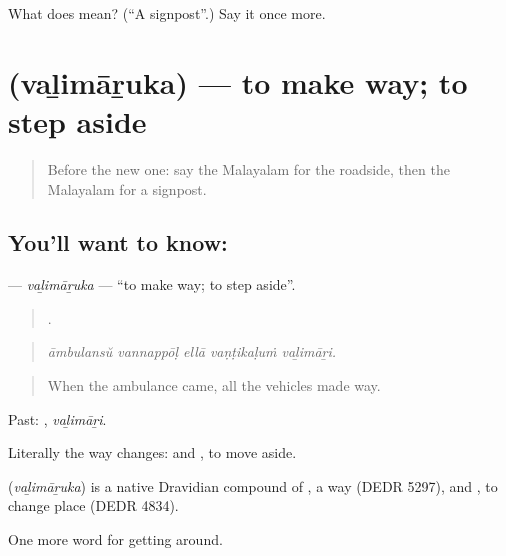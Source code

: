 \begin{tcolorbox}[breakable,colback=teal!4,colframe=teal!35!black,title={Before you move on}]
What does  mean? (\textquotedblleft{}A signpost\textquotedblright{}.) Say it once more.
\end{tcolorbox}
\section[\texorpdfstring{\ml{വഴിമാറുക} (vaḻimāṟuka)}{വഴിമാറുക (vaḻimāṟuka)}]{ (vaḻimāṟuka) — to make way; to step aside}

\label{lesson:ML-C469-valimaruka}



\begin{quote}
Before the new one: say the Malayalam for the roadside, then the Malayalam for a signpost.
\end{quote}

\subsection*{You'll want to know: }
\textbf{} — \emph{vaḻimāṟuka} — \textquotedblleft{}to make way; to step aside\textquotedblright{}.

\begin{quote}
    .
\end{quote}

\begin{quote}
\emph{āmbulansŭ vannappōḷ ellā vaṇṭikaḷuṁ vaḻimāṟi.}
\end{quote}

\begin{quote}
When the ambulance came, all the vehicles made way.
\end{quote}

Past: , \emph{vaḻimāṟi}.

Literally the way changes:  and , to move aside.

\begin{cousinweb}
\textbf{} (\emph{vaḻimāṟuka}) is a native Dravidian compound of , a way (DEDR 5297), and , to change place (DEDR 4834).
\end{cousinweb}

\begin{grammarlens}[title={What you've built}]
One more word for getting around.
\end{grammarlens}

